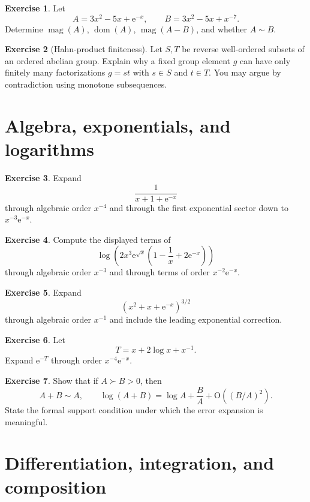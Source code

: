\documentclass[11pt,openany]{book}
\theoremstyle{plain}
\theoremstyle{definition}
\newtheorem{exercise}{Exercise}[chapter]
\theoremstyle{remark}
\newcommand{\magop}{\operatorname{mag}}
\newcommand{\domop}{\operatorname{dom}}
\newcommand{\bigO}{\mathrm{O}}
\newcommand{\e}{\mathrm{e}}
\begin{document}
\begin{exercise}
Let
\[
  A=3x^2-5x+\e^{-x},
  \qquad
  B=3x^2-5x+x^{-7}.
\]
Determine $\magop(A)$, $\domop(A)$, $\magop(A-B)$, and whether $A\sim B$.
\end{exercise}

\begin{exercise}[Hahn-product finiteness]
Let $S,T$ be reverse well-ordered subsets of an ordered abelian group. Explain why a fixed group element $g$ can have only finitely many factorizations $g=st$ with $s\in S$ and $t\in T$. You may argue by contradiction using monotone subsequences.
\end{exercise}

\section{Algebra, exponentials, and logarithms}

\begin{exercise}
Expand
\[
  \frac{1}{x+1+\e^{-x}}
\]
through algebraic order $x^{-4}$ and through the first exponential sector down to $x^{-3}\e^{-x}$.
\end{exercise}

\begin{exercise}
Compute the displayed terms of
\[
  \log\left(2x^3\e^{\sqrt{x}}
  \left(1-\frac1x+2\e^{-x}\right)\right)
\]
through algebraic order $x^{-3}$ and through terms of order $x^{-2}\e^{-x}$.
\end{exercise}

\begin{exercise}
Expand
\[
  \left(x^2+x+\e^{-x}\right)^{3/2}
\]
through algebraic order $x^{-1}$ and include the leading exponential correction.
\end{exercise}

\begin{exercise}
Let
\[
  T=x+2\log x+x^{-1}.
\]
Expand $\e^{-T}$ through order $x^{-4}\e^{-x}$.
\end{exercise}

\begin{exercise}
Show that if $A\succ B>0$, then
\[
  A+B\sim A,
  \qquad
  \log(A+B)=\log A+\frac BA+\bigO((B/A)^2).
\]
State the formal support condition under which the error expansion is meaningful.
\end{exercise}

\section{Differentiation, integration, and composition}
\end{document}
